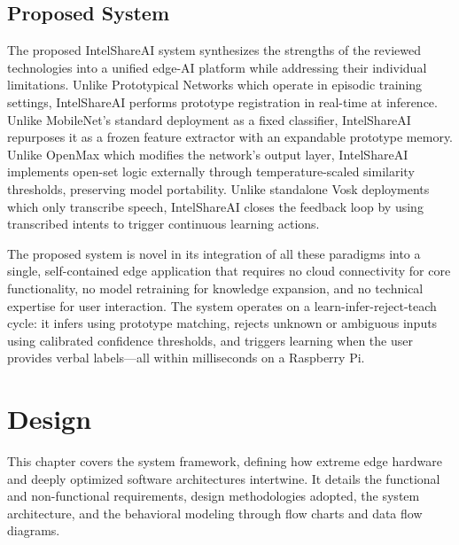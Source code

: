 \documentclass[12pt,a4paper]{report}
\begin{document}
\section{Proposed System}
The proposed IntelShareAI system synthesizes the strengths of the reviewed technologies into a unified edge-AI platform while addressing their individual limitations. Unlike Prototypical Networks which operate in episodic training settings, IntelShareAI performs prototype registration in real-time at inference. Unlike MobileNet's standard deployment as a fixed classifier, IntelShareAI repurposes it as a frozen feature extractor with an expandable prototype memory. Unlike OpenMax which modifies the network's output layer, IntelShareAI implements open-set logic externally through temperature-scaled similarity thresholds, preserving model portability. Unlike standalone Vosk deployments which only transcribe speech, IntelShareAI closes the feedback loop by using transcribed intents to trigger continuous learning actions. 

The proposed system is novel in its integration of all these paradigms into a single, self-contained edge application that requires no cloud connectivity for core functionality, no model retraining for knowledge expansion, and no technical expertise for user interaction. The system operates on a learn-infer-reject-teach cycle: it infers using prototype matching, rejects unknown or ambiguous inputs using calibrated confidence thresholds, and triggers learning when the user provides verbal labels---all within milliseconds on a Raspberry Pi.

\chapter{Design}

This chapter covers the system framework, defining how extreme edge hardware and deeply optimized software architectures intertwine. It details the functional and non-functional requirements, design methodologies adopted, the system architecture, and the behavioral modeling through flow charts and data flow diagrams.
\end{document}

